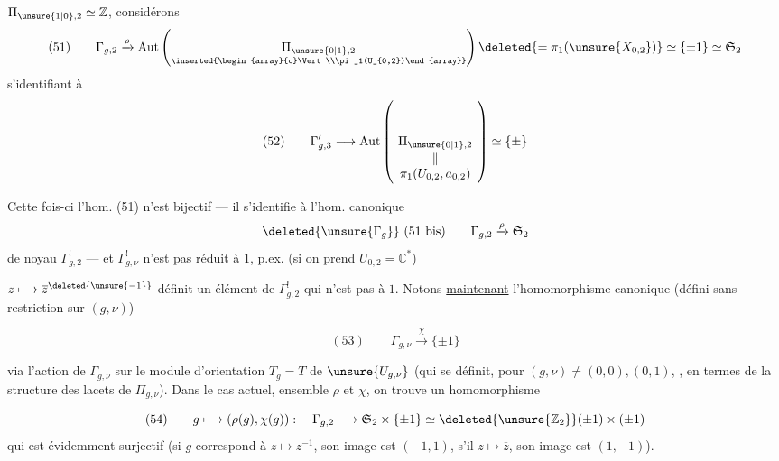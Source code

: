  $\Pi_{\unsure{1|0},2}\simeq\mathbb{Z}$, considérons
\[
(51)\qquad\Gamma_{g,2}\xrightarrow{\rho}\operatorname{Aut}\left(\underset{\inserted{\begin{array}{c}\Vert\\\pi_1(U_{0,2})\end{array}}}{\Pi_{\unsure{0|1},2}}\right)\deleted{=\pi_1(\unsure{X_{0,2}})}\simeq\{\pm1\}\simeq\mathfrak S_2
\]
s'identifiant à
\[
(52)\qquad\Gamma'_{g,3}\longrightarrow\operatorname{Aut}\left(\underset{\begin{array}{c}\Vert\\\pi_1(U_{0,2},a_{0,2})\end{array}}{\Pi_{\unsure{0|1},2}}\right)\simeq\{\pm\}
\]

Cette fois-ci l'hom. (51) n'est  bijectif --- il s'identifie à l'hom. canonique
\[
\deleted{\unsure{\Gamma_g}}\ (51\text{ bis})\qquad\Gamma_{g,2}\xrightarrow{\rho}\mathfrak S_2
\]
de noyau $\Gamma^!_{g,2}$ --- et $\Gamma^!_{g,\nu}$ n'est pas réduit à $1$, p.ex. (si on prend $U_{0,2}=\mathbb{C}^*$)

$z\longmapsto\overline z^{\deleted{\unsure{-1}}}$ définit un élément de $\Gamma^!_{g,2}$ qui n'est pas  à $1$. Notons \uline{maintenant} l'homomorphisme canonique (défini sans restriction sur $(g,\nu)$)

\[
(53)\qquad\Gamma_{g,\nu}\xrightarrow{\chi}\{\pm1\}
\]

via l'action de $\Gamma_{g,\nu}$ sur le module d'orientation $T_g=T$ de $\unsure{U_{g,\nu}}$  (qui se définit, pour $(g,\nu)\neq(0,0),(0,1)$, , en termes de la structure des lacets de $\Pi_{g,\nu}$). Dans le cas actuel,  ensemble $\rho$ et $\chi$, on trouve un homomorphisme

\[
(54)\qquad g\longmapsto(\rho(g),\chi(g)):\quad\Gamma_{g,2}\longrightarrow\mathfrak S_2\times\{\pm1\}
\simeq\deleted{\unsure{\mathbb{Z}_2}}(\pm1)\times(\pm1)
\]
qui est évidemment surjectif (si $g$ correspond à $z\longmapsto z^{-1}$, son image est $(-1,1)$, s'il  $z\longmapsto\overline z$, son image est $(1,-1)$).


